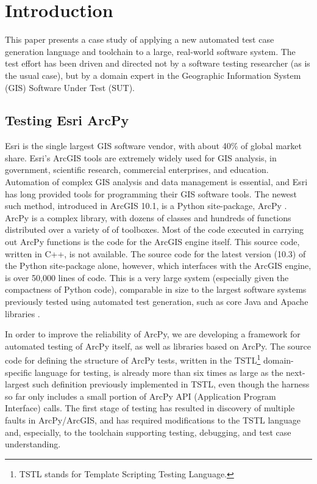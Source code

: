 \section{Introduction}

This paper presents a case study of applying a new automated test case
generation language and toolchain to a large, real-world software system.
The test effort has been driven and directed not by a software testing
researcher (as is the usual case), but by a domain expert in the
Geographic Information System (GIS)
Software Under Test (SUT).  

\subsection{Testing Esri ArcPy}


Esri is the single largest GIS software vendor, with about 40\% of
global market share.  Esri's ArcGIS tools are extremely widely used
for GIS analysis, in government, scientific research, commercial
enterprises, and education.  Automation of complex GIS analysis and
data management is essential, and Esri has long provided tools for
programming their GIS software tools.  The newest such method,
introduced in ArcGIS 10.1, is a Python site-package, ArcPy
\cite{ArcPy}.  ArcPy is a complex library, with dozens of classes and
hundreds of functions distributed over a variety of of toolboxes.
Most of the code executed in carrying out ArcPy functions is the code
for the ArcGIS engine itself.  This source code, written in C++, is
not available.  The source code for the latest version (10.3) of the
Python site-package alone, however, which interfaces with the ArcGIS
engine, is over 50,000 lines of code.  This is a very large system
(especially given the compactness of Python code), comparable in size
to the largest software systems previously tested using automated test
generation, such as core Java and Apache libraries
\cite{FA11,Pacheco}.

In order to improve the reliability of ArcPy, we are developing a
framework for automated testing of ArcPy itself, as well as libraries
based on ArcPy.  The source code for defining the structure of ArcPy
tests, written in the TSTL\footnote{TSTL stands for Template Scripting
  Testing Language.}\cite{NFM15,ISSTA14,tstl} domain-specific
language \cite{Fow10} for testing, is already more than six times as
large as the next-largest such definition previously implemented in
TSTL, even though the harness so far only includes a small portion of ArcPy
API (Application Program Interface) calls. The first stage of testing has resulted in discovery of
multiple faults in ArcPy/ArcGIS, and has required modifications to the
TSTL language and, especially, to the toolchain supporting testing,
debugging, and test case understanding.

